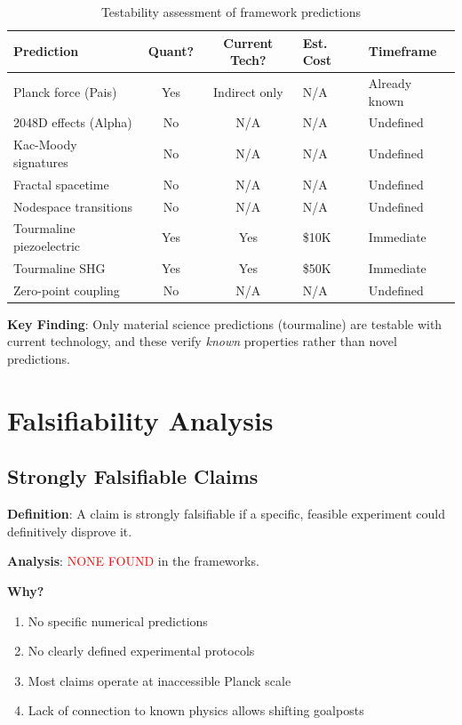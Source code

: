 \begin{table}[H]
\centering
\footnotesize
\begin{tabular}{p{4cm}ccp{2.5cm}p{2cm}}
\toprule
\textbf{Prediction} & \textbf{Quant?} & \textbf{Current Tech?} & \textbf{Est. Cost} & \textbf{Timeframe} \\
\midrule
Planck force (Pais) & Yes & Indirect only & N/A & Already known \\
2048D effects (Alpha) & No & N/A & N/A & Undefined \\
Kac-Moody signatures & No & N/A & N/A & Undefined \\
Fractal spacetime & No & N/A & N/A & Undefined \\
Nodespace transitions & No & N/A & N/A & Undefined \\
Tourmaline piezoelectric & Yes & Yes & \$10K & Immediate \\
Tourmaline SHG & Yes & Yes & \$50K & Immediate \\
Zero-point coupling & No & N/A & N/A & Undefined \\
\bottomrule
\end{tabular}
\caption{Testability assessment of framework predictions}
\end{table}

\textbf{Key Finding}: Only material science predictions (tourmaline) are testable with current technology, and these verify \textit{known} properties rather than novel predictions.

\section{Falsifiability Analysis}

\subsection{Strongly Falsifiable Claims}

\textbf{Definition}: A claim is strongly falsifiable if a specific, feasible experiment could definitively disprove it.

\textbf{Analysis}: \textcolor{red}{NONE FOUND} in the frameworks.

\textbf{Why?}
\begin{enumerate}
    \item No specific numerical predictions
    \item No clearly defined experimental protocols
    \item Most claims operate at inaccessible Planck scale
    \item Lack of connection to known physics allows shifting goalposts
\end{enumerate}

